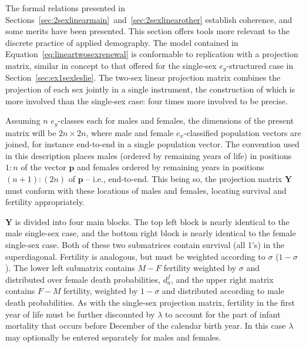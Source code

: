  \FloatBarrier
 \label{sec:ex2sxprojmat}
The formal relations presented in
Sections~\ref{sec:2sexlinearmain}~and~\ref{sec:2sexlinearother} establish
coherence, and some merits have been presented. This section offers tools
more relevant to the discrete practice of applied demography. The model
contained in Equation~\eqref{eq:lineartwosexrenewal} is conformable to
replication with a projection matrix, similar in concept to that offered for the 
single-sex $e_y$-structured
case in Section~\ref{sec:ex1sexleslie}. The two-sex linear projection matrix combines
the projection of each sex jointly in a single instrument, the construction of 
which is more involved than the single-sex case: four times more involved to be precise. 

Assuming $n$ $e_y$-classes each for males and females, the dimensions of the
present matrix will be $2n \times 2n$, where male and female
$e_x$-classified population vectors are joined, for instance end-to-end in a
single population vector. The convention used in this description places
males (ordered by remaining years of life) in positions $1:n$ of the vector
$\textbf{p}$ and females ordered by remaining years in positions $(n+1):(2n)$ of
$\textbf{p}$ -- i.e., end-to-end. This being so, the projection matrix
$\textbf{Y}$ must conform with these locations of males and females, locating survival and 
fertility appropriately.

$\textbf{Y}$ is divided into four main blocks. The top left block is
nearly identical to the male single-sex case, and the bottom right block is
nearly identical to the female single-sex case. Both of these two submatrices
contain survival (all 1's) in the superdiagonal. Fertility is analogous, but
must be weighted according to $\sigma$ ($1-\sigma$). The lower left submatrix
contains $M-F$ fertility weighted by $\sigma$ and distributed over female death probabilities,
$d_a^f$, and the upper right matrix contains $F-M$ fertility, weighted by
$1-\sigma$ and distributed according to male death probabilities. As with the
single-sex projection matrix, fertility in the first year of
life must be further discounted by $\lambda$ to account for the part of infant
mortality that occurs before December  of the calendar birth year. In
this case $\lambda$ may optionally be entered separately for males and females.

